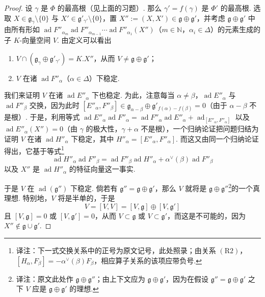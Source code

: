 \begin{proof}
设 $\gamma$ 是 $\Phi$ 的最高根（见上面的习题）. 那么 $\gamma'=f(\gamma)$ 是 $\Phi'$ 的最高根. 选取 $X\in\mathfrak g_{\gamma}\setminus\{0\}$ 与 $X'\in\mathfrak g'_{\gamma'}\setminus\{0\}$，置 $X'':=(X,X')\in\mathfrak g\oplus\mathfrak g'$，并考虑 $\mathfrak g\oplus\mathfrak g'$ 中由所有形如 $\operatorname{ad}F''_{\alpha_m}\operatorname{ad}F''_{\alpha_{m-1}}\cdots\operatorname{ad}F''_{\alpha_1}(X'')$（$m\in\mathbb N$，$\alpha_i\in\Delta$）的元素生成的子 $K$-向量空间 $V$. 由定义可以看出
\begin{enumerate}[label=\roman*)]
\item $V\cap(\mathfrak g_{\gamma}\oplus\mathfrak g'_{\gamma'})=K.X''$，从而 $V\neq\mathfrak g\oplus\mathfrak g'$；
\item $V$ 在诸 $\operatorname{ad}F''_{\alpha}$（$\alpha\in\Delta$）下稳定.
\end{enumerate}
我们来证明 $V$ 在诸 $\operatorname{ad}E''_{\alpha}$ 下也稳定. 为此，注意每当 $\alpha\neq\beta$，$\operatorname{ad}E''_{\alpha}$ 与 $\operatorname{ad}F''_{\beta}$ 交换，因为此时 $[E''_{\alpha},F''_{\beta}]\in\mathfrak g_{\alpha-\beta}\oplus\mathfrak g'_{f(\alpha)-f(\beta)}=0$（由于 $\alpha-\beta$ 不是根）. 于是，利用等式 $\operatorname{ad}E''_{\alpha}\operatorname{ad}F''_{\alpha}=\operatorname{ad}F''_{\alpha}\operatorname{ad}E''_{\alpha}+\operatorname{ad}_{[E''_{\alpha},F''_{\alpha}]}$ 以及 $\operatorname{ad}E''_{\alpha}(X'')=0$（由 $\gamma$ 的极大性，$\gamma+\alpha$ 不是根），一个归纳论证把问题归结为证明 $V$ 在诸 $\operatorname{ad}H''_{\alpha}$ 下稳定，其中 $H''_{\alpha}=[E''_{\alpha},F''_{\alpha}]$. 而这又由同一个归纳论证得出，它基于等式\footnote{译注：下一式交换关系中的正号为原文记号，此处照录；由关系 $(\mathrm R2)$，$[H_\alpha,F_\beta]=-\alpha^\vee(\beta)F_\beta$，相应算子关系的该项应带负号.}
\[\operatorname{ad}H''_{\alpha}\operatorname{ad}F''_{\beta}=\operatorname{ad}F''_{\beta}\operatorname{ad}H''_{\alpha}+\alpha^{\vee}(\beta)\operatorname{ad}F''_{\beta}\]
以及 $X''$ 是 $\operatorname{ad}H''_{\alpha}$ 的特征向量这一事实.

于是 $V$ 在 $\operatorname{ad}(\mathfrak g'')$ 下稳定. 倘若有 $\mathfrak g''=\mathfrak g\oplus\mathfrak g'$，那么 $V$ 就将是 $\mathfrak g\oplus\mathfrak g''$\footnote{译注：原文此处作 $\mathfrak g\oplus\mathfrak g''$；由上下文应为 $\mathfrak g\oplus\mathfrak g'$，因为在假设 $\mathfrak g''=\mathfrak g\oplus\mathfrak g'$ 之下 $V$ 应是 $\mathfrak g\oplus\mathfrak g'$ 的理想.}的一个真理想. 特别地，$V$ 将是半单的，于是
\[V=[V,V]=[V,\mathfrak g]\oplus[V,\mathfrak g']\]
且 $[V,\mathfrak g]=0$ 或 $[V,\mathfrak g']=0$，从而 $V\subset\mathfrak g$ 或 $V\subset\mathfrak g'$，而这是不可能的，因为 $X''\notin\mathfrak g\cup\mathfrak g'$.
\end{proof}

